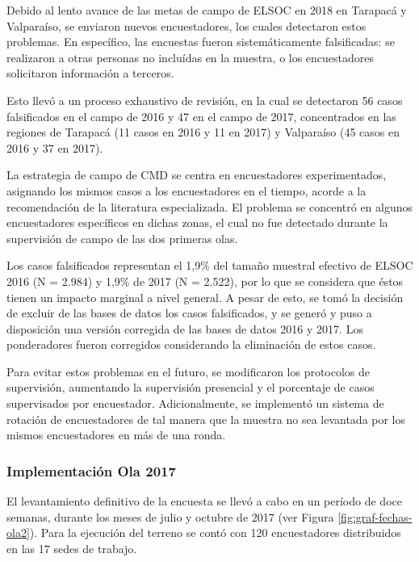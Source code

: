 \documentclass[
  12pt,
]{article}
\begin{document}
Debido al lento avance de las metas de campo de ELSOC en 2018 en Tarapacá y Valparaíso, se enviaron nuevos encuestadores, los cuales detectaron estos problemas. En específico, las encuestas fueron sistemáticamente falsificadas: se realizaron a otras personas no incluídas en la muestra, o los encuestadores solicitaron información a terceros.

Esto llevó a un proceso exhaustivo de revisión, en la cual se detectaron 56 casos falsificados en el campo de 2016 y 47 en el campo de 2017, concentrados en las regiones de Tarapacá (11 casos en 2016 y 11 en 2017) y Valparaíso (45 casos en 2016 y 37 en 2017).

La estrategia de campo de CMD se centra en encuestadores experimentados, asignando los mismos casos a los encuestadores en el tiempo, acorde a la recomendación de la literatura especializada. El problema se concentró en algunos encuestadores específicos en dichas zonas, el cual no fue detectado durante la supervisión de campo de las dos primeras olas.

Los casos falsificados representan el 1,9\% del tamaño muestral efectivo de ELSOC 2016 (N = 2.984) y 1,9\% de 2017 (N = 2.522), por lo que se considera que éstos tienen un impacto marginal a nivel general. A pesar de esto, se tomó la decisión de excluir de las bases de datos los casos falsificados, y se generó y puso a disposición una versión corregida de las bases de datos 2016 y 2017. Los ponderadores fueron corregidos considerando la eliminación de estos casos.

Para evitar estos problemas en el futuro, se modificaron los protocolos de supervisión, aumentando la supervisión presencial y el porcentaje de casos supervisados por encuestador. Adicionalmente, se implementó un sistema de rotación de encuestadores de tal manera que la muestra no sea levantada por los mismos encuestadores en más de una ronda.

\hypertarget{implementaciuxf3n-ola-2017}{%
\subsubsection{Implementación Ola 2017}\label{implementaciuxf3n-ola-2017}}

El levantamiento definitivo de la encuesta se llevó a cabo en un período de doce semanas, durante los meses de julio y octubre de 2017 (ver Figura \ref{fig:graf-fechas-ola2}). Para la ejecución del terreno se contó con 120 encuestadores distribuidos en las 17 sedes de trabajo.
\end{document}
